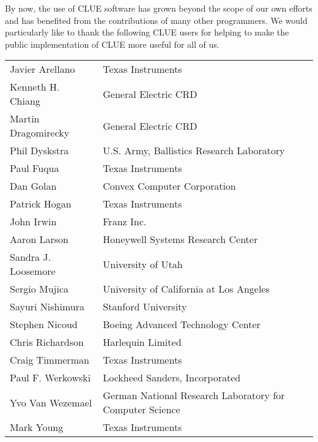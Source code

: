 By now, the use of CLUE software has grown beyond the scope of our own efforts
and has benefited from the contributions of many other programmers.  We would
particularly like to thank the following CLUE users for helping to make the
public implementation of CLUE more useful for all of us.

\begin{tabular}{ll}
Javier Arellano          & Texas Instruments \\
Kenneth H. Chiang        & General Electric CRD\\
Martin Dragomirecky      & General Electric CRD\\
Phil Dyskstra            & U.S. Army, Ballistics Research Laboratory \\
Paul Fuqua               & Texas Instruments \\
Dan Golan                & Convex Computer Corporation \\
Patrick Hogan            & Texas Instruments \\
John Irwin               & Franz Inc.\\
Aaron Larson             & Honeywell Systems Research Center\\
Sandra J. Loosemore      & University of Utah \\
Sergio Mujica            & University of California at Los Angeles \\
Sayuri Nishimura         & Stanford University \\
Stephen Nicoud           & Boeing Advanced Technology Center\\
Chris Richardson         & Harlequin Limited \\
Craig Timmerman          & Texas Instruments \\
Paul F. Werkowski        & Lockheed Sanders, Incorporated \\
Yvo Van Wezemael         & German National Research Laboratory for Computer Science\\ 
Mark Young               & Texas Instruments \\
\end{tabular}


